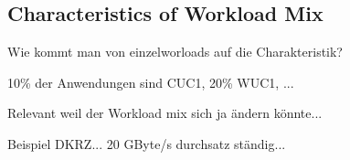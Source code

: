 {\subsection{Characteristics of Workload Mix}

Wie kommt man von einzelworloads auf die Charakteristik?

10\% der Anwendungen sind CUC1, 20\% WUC1, ...

Relevant weil der Workload mix sich ja ändern könnte...


Beispiel DKRZ...
20 GByte/s durchsatz ständig...



}




\newpage
